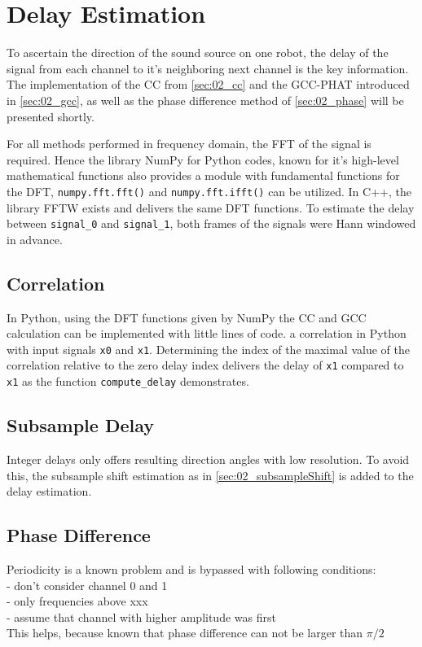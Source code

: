 \section{Delay Estimation}
\label{sec:03_delay}

To ascertain the direction of the sound source on one robot, the
delay of the signal from each channel to it's neighboring
next channel is the key information.
The implementation of the \ac{CC} from \cref{sec:02_cc} and the \ac{GCC-PHAT}
introduced in \cref{sec:02_gcc}, as well as the phase difference method
of \cref{sec:02_phase} will be presented shortly.

For all methods performed in frequency domain, the \ac{FFT} of the
signal is required. Hence the library NumPy for Python codes, known for it's high-level
mathematical functions also provides a module with fundamental
functions for the \ac{DFT}, \lstinline!numpy.fft.fft()! and
\lstinline!numpy.fft.ifft()! can be utilized.
In C++, the library \ac{FFTW} exists and delivers the same \ac{DFT} functions.
To estimate the delay between \lstinline!signal_0! and \lstinline!signal_1!,
both frames of the signals were Hann windowed in advance.
\subsection*{Correlation}
\label{subsec:03_cc}

In Python, using the \ac{DFT} functions given by NumPy the \ac{CC} and \ac{GCC} calculation
can be implemented with little lines of code.
a correlation in Python with input signals \lstinline!x0! and \lstinline!x1!.
Determining the index of the maximal value of the correlation relative to the zero delay
index delivers the delay of \lstinline!x1! compared to \lstinline!x1! as the function
\lstinline!compute_delay! demonstrates.
\subsection*{Subsample Delay}
\label{subsec:03_subsample}

Integer delays only offers resulting direction angles with low resolution.
To avoid this, the subsample shift estimation as in \cref{sec:02_subsampleShift}
is added to the delay estimation.

\subsection*{Phase Difference}
\label{subsec:03_phase}

Periodicity is a known problem and is bypassed with following conditions:\\
- don't consider channel 0 and 1\\
- only frequencies above xxx\\
- assume that channel with higher amplitude was first\\
This helps, because known that phase difference can not be larger than $\pi/2$

